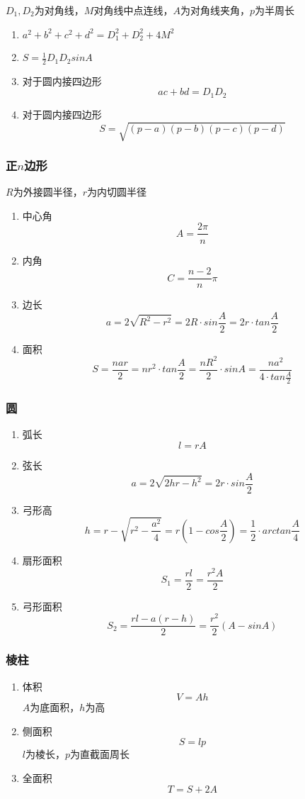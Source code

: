 \documentclass[a4paper]{article}
\begin{document}
$D_1, D_2$为对角线，$M$对角线中点连线，$A$为对角线夹角，$p$为半周长
\begin{enumerate}
	\item $a^2+b^2+c^2+d^2=D_1^2+D_2^2+4M^2$
	\item $S=\frac{1}{2}D_1D_2sinA$
	\item 对于圆内接四边形
		$$ac+bd=D_1D_2$$
	\item 对于圆内接四边形
		$$S=\sqrt{(p-a)(p-b)(p-c)(p-d)}$$
\end{enumerate}

\subsubsection{正$n$边形}

$R$为外接圆半径，$r$为内切圆半径
\begin{enumerate}
	\item 中心角
		$$A=\frac{2\pi}{n}$$
	\item 内角
		$$C=\frac{n-2}{n}\pi$$
	\item 边长
		$$a=2\sqrt{R^2-r^2}=2R \cdot sin\frac{A}{2}=2r \cdot tan\frac{A}{2}$$
	\item 面积
		$$S=\frac{nar}{2}=nr^2 \cdot tan\frac{A}{2}=\frac{nR^2}{2} \cdot sinA=\frac{na^2}{4 \cdot tan\frac{A}{2}}$$
\end{enumerate}

\subsubsection{圆}

\begin{enumerate}
	\item 弧长
		$$l=rA$$
	\item 弦长
		$$a=2\sqrt{2hr-h^2}=2r\cdot sin\frac{A}{2}$$
	\item 弓形高
		$$h=r-\sqrt{r^2-\frac{a^2}{4}}=r(1-cos\frac{A}{2})=\frac{1}{2} \cdot arctan\frac{A}{4}$$
	\item 扇形面积
		$$S_1=\frac{rl}{2}=\frac{r^2A}{2}$$
	\item 弓形面积
		$$S_2=\frac{rl-a(r-h)}{2}=\frac{r^2}{2}(A-sinA)$$
\end{enumerate}

\subsubsection{棱柱}

\begin{enumerate}
	\item 体积
		$$V=Ah$$
		$A$为底面积，$h$为高
	\item 侧面积
		$$S=lp$$
		$l$为棱长，$p$为直截面周长
	\item 全面积
		$$T=S+2A$$
\end{enumerate}
\end{document}
